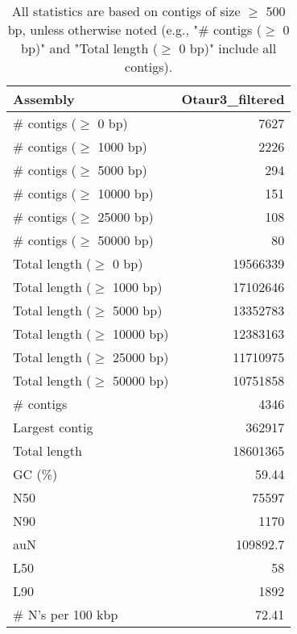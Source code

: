 \documentclass[12pt,a4paper]{article}
\begin{document}
\begin{table}[ht]
\begin{center}
\caption{All statistics are based on contigs of size $\geq$ 500 bp, unless otherwise noted (e.g., "\# contigs ($\geq$ 0 bp)" and "Total length ($\geq$ 0 bp)" include all contigs).}
\begin{tabular}{|l*{1}{|r}|}
\hline
Assembly & Otaur3\_filtered \\ \hline
\# contigs ($\geq$ 0 bp) & 7627 \\ \hline
\# contigs ($\geq$ 1000 bp) & 2226 \\ \hline
\# contigs ($\geq$ 5000 bp) & 294 \\ \hline
\# contigs ($\geq$ 10000 bp) & 151 \\ \hline
\# contigs ($\geq$ 25000 bp) & 108 \\ \hline
\# contigs ($\geq$ 50000 bp) & 80 \\ \hline
Total length ($\geq$ 0 bp) & 19566339 \\ \hline
Total length ($\geq$ 1000 bp) & 17102646 \\ \hline
Total length ($\geq$ 5000 bp) & 13352783 \\ \hline
Total length ($\geq$ 10000 bp) & 12383163 \\ \hline
Total length ($\geq$ 25000 bp) & 11710975 \\ \hline
Total length ($\geq$ 50000 bp) & 10751858 \\ \hline
\# contigs & 4346 \\ \hline
Largest contig & 362917 \\ \hline
Total length & 18601365 \\ \hline
GC (\%) & 59.44 \\ \hline
N50 & 75597 \\ \hline
N90 & 1170 \\ \hline
auN & 109892.7 \\ \hline
L50 & 58 \\ \hline
L90 & 1892 \\ \hline
\# N's per 100 kbp & 72.41 \\ \hline
\end{tabular}
\end{center}
\end{table}
\end{document}
